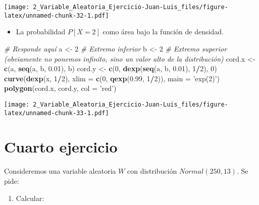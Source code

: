 \documentclass[
]{article}
\newenvironment{Shaded}{\begin{snugshade}}{\end{snugshade}}
\newcommand{\CommentTok}[1]{\textcolor[rgb]{0.56,0.35,0.01}{\textit{#1}}}
\newcommand{\DataTypeTok}[1]{\textcolor[rgb]{0.13,0.29,0.53}{#1}}
\newcommand{\DecValTok}[1]{\textcolor[rgb]{0.00,0.00,0.81}{#1}}
\newcommand{\FloatTok}[1]{\textcolor[rgb]{0.00,0.00,0.81}{#1}}
\newcommand{\KeywordTok}[1]{\textcolor[rgb]{0.13,0.29,0.53}{\textbf{#1}}}
\newcommand{\NormalTok}[1]{#1}
\newcommand{\OperatorTok}[1]{\textcolor[rgb]{0.81,0.36,0.00}{\textbf{#1}}}
\newcommand{\StringTok}[1]{\textcolor[rgb]{0.31,0.60,0.02}{#1}}
\providecommand{\tightlist}{%
  \setlength{\itemsep}{0pt}\setlength{\parskip}{0pt}}
\begin{document}
\texttt{[image: 2\_Variable\_Aleatoria\_Ejercicio-Juan-Luis\_files/figure-latex/unnamed-chunk-32-1.pdf]}

\begin{itemize}
\tightlist
\item
  La probabilidad \(P [X = 2]\) como área bajo la función de densidad.
\end{itemize}

\begin{Shaded}
\begin{Highlighting}[]
\CommentTok{# Responde aquí}
\NormalTok{a <-}\StringTok{ }\DecValTok{2} \CommentTok{# Extremo inferior}
\NormalTok{b <-}\StringTok{ }\DecValTok{2} \CommentTok{# Extremo superior (obviamente no ponemos infinito, sino un valor alto de la distribución)}
\NormalTok{cord.x <-}\StringTok{ }\KeywordTok{c}\NormalTok{(a, }\KeywordTok{seq}\NormalTok{(a, b, }\FloatTok{0.01}\NormalTok{), b) }
\NormalTok{cord.y <-}\StringTok{ }\KeywordTok{c}\NormalTok{(}\DecValTok{0}\NormalTok{, }\KeywordTok{dexp}\NormalTok{(}\KeywordTok{seq}\NormalTok{(a, b, }\FloatTok{0.01}\NormalTok{), }\DecValTok{1}\OperatorTok{/}\DecValTok{2}\NormalTok{), }\DecValTok{0}\NormalTok{) }
\KeywordTok{curve}\NormalTok{(}\KeywordTok{dexp}\NormalTok{(x, }\DecValTok{1}\OperatorTok{/}\DecValTok{2}\NormalTok{), }\DataTypeTok{xlim =} \KeywordTok{c}\NormalTok{(}\DecValTok{0}\NormalTok{, }\KeywordTok{qexp}\NormalTok{(}\FloatTok{0.99}\NormalTok{, }\DecValTok{1}\OperatorTok{/}\DecValTok{2}\NormalTok{)), }\DataTypeTok{main =} \StringTok{'exp(2)'}\NormalTok{) }
\KeywordTok{polygon}\NormalTok{(cord.x, cord.y, }\DataTypeTok{col =} \StringTok{'red'}\NormalTok{)}
\end{Highlighting}
\end{Shaded}

\texttt{[image: 2\_Variable\_Aleatoria\_Ejercicio-Juan-Luis\_files/figure-latex/unnamed-chunk-33-1.pdf]}

\hypertarget{cuarto-ejercicio}{%
\section{Cuarto ejercicio}\label{cuarto-ejercicio}}

Consideremos una variable aleatoria \(W\) con distribución
\(Normal(250, 13)\). Se pide:

\begin{enumerate}
\def\labelenumi{\arabic{enumi}.}
\tightlist
\item
  Calcular:
\end{enumerate}
\end{document}
